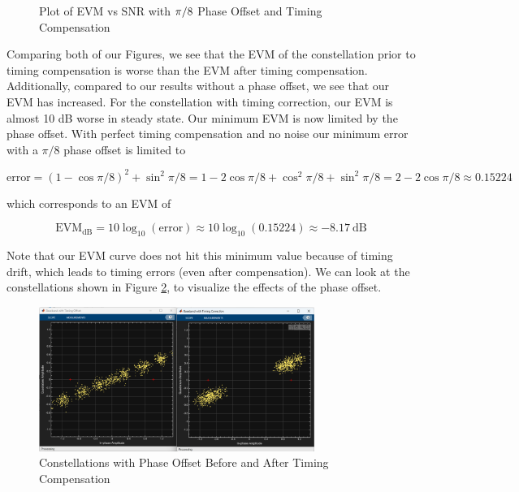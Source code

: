 \documentclass{article}
\begin{document}
\begin{figure}[H]
	\centerline{}
	\caption{Plot of EVM vs SNR with $\protect\pi/8$ Phase Offset and Timing Compensation}
	\label{fig::evm_vs_snr_with_phase_offset}
\end{figure}

\noindent Comparing both of our Figures, we see that the EVM of the constellation prior to timing compensation is worse than the EVM after timing compensation. Additionally, compared to our results without a phase offset, we see that our EVM has increased. For the constellation with timing correction, our EVM is almost 10 dB worse in steady state. Our minimum EVM is now limited by the phase offset. With perfect timing compensation and no noise our minimum error with a $\pi/8$ phase offset is limited to

\begin{equation}
	\text{error} = (1 - \cos\pi/8)^2 + \sin^2\pi/8 = 1 - 2\cos\pi/8 + \cos^2\pi/8 + \sin^2\pi/8 = 2 - 2\cos\pi/8 \approx 0.15224 
\end{equation}

\noindent which corresponds to an EVM of 

\begin{equation}
	\text{EVM}_{\text{dB}} = 10\log_{10}\left(\text{error}\right) \approx 10\log_{10}(0.15224) \approx -8.17\ \text{dB}
\end{equation}

\noindent Note that our EVM curve does not hit this minimum value because of timing drift, which leads to timing errors (even after compensation). We can look at the constellations shown in Figure \ref{fig::constellations_with_timing_correction_phase_offset}, to visualize the effects of the phase offset.

\begin{figure}[H]
	\centerline{\includegraphics[width=0.8\textwidth]{constellations_with_timing_correction_phase_offset.png}}
	\caption{Constellations with Phase Offset Before and After Timing Compensation}
	\label{fig::constellations_with_timing_correction_phase_offset}
\end{figure}
\end{document}
